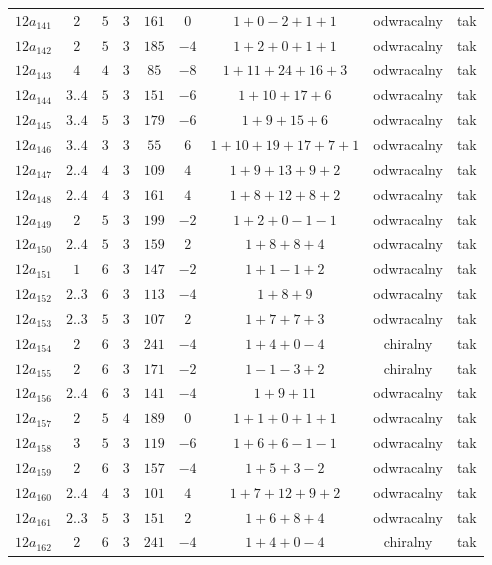 \begin{longtable}{ccccccccc}
$12a_{141}$ & $2$ & $5$ & $3$ & $161$ & $0$ & $1+0-2+1+1$ & odwracalny & tak \\
$12a_{142}$ & $2$ & $5$ & $3$ & $185$ & $-4$ & $1+2+0+1+1$ & odwracalny & tak \\
$12a_{143}$ & $4$ & $4$ & $3$ & $85$ & $-8$ & $1+11+24+16+3$ & odwracalny & tak \\
$12a_{144}$ & $3..4$ & $5$ & $3$ & $151$ & $-6$ & $1+10+17+6$ & odwracalny & tak \\
$12a_{145}$ & $3..4$ & $5$ & $3$ & $179$ & $-6$ & $1+9+15+6$ & odwracalny & tak \\
$12a_{146}$ & $3..4$ & $3$ & $3$ & $55$ & $6$ & $1+10+19+17+7+1$ & odwracalny & tak \\
$12a_{147}$ & $2..4$ & $4$ & $3$ & $109$ & $4$ & $1+9+13+9+2$ & odwracalny & tak \\
$12a_{148}$ & $2..4$ & $4$ & $3$ & $161$ & $4$ & $1+8+12+8+2$ & odwracalny & tak \\
$12a_{149}$ & $2$ & $5$ & $3$ & $199$ & $-2$ & $1+2+0-1-1$ & odwracalny & tak \\
$12a_{150}$ & $2..4$ & $5$ & $3$ & $159$ & $2$ & $1+8+8+4$ & odwracalny & tak \\
$12a_{151}$ & $1$ & $6$ & $3$ & $147$ & $-2$ & $1+1-1+2$ & odwracalny & tak \\
$12a_{152}$ & $2..3$ & $6$ & $3$ & $113$ & $-4$ & $1+8+9$ & odwracalny & tak \\
$12a_{153}$ & $2..3$ & $5$ & $3$ & $107$ & $2$ & $1+7+7+3$ & odwracalny & tak \\
$12a_{154}$ & $2$ & $6$ & $3$ & $241$ & $-4$ & $1+4+0-4$ & chiralny & tak \\
$12a_{155}$ & $2$ & $6$ & $3$ & $171$ & $-2$ & $1-1-3+2$ & chiralny & tak \\
$12a_{156}$ & $2..4$ & $6$ & $3$ & $141$ & $-4$ & $1+9+11$ & odwracalny & tak \\
$12a_{157}$ & $2$ & $5$ & $4$ & $189$ & $0$ & $1+1+0+1+1$ & odwracalny & tak \\
$12a_{158}$ & $3$ & $5$ & $3$ & $119$ & $-6$ & $1+6+6-1-1$ & odwracalny & tak \\
$12a_{159}$ & $2$ & $6$ & $3$ & $157$ & $-4$ & $1+5+3-2$ & odwracalny & tak \\
$12a_{160}$ & $2..4$ & $4$ & $3$ & $101$ & $4$ & $1+7+12+9+2$ & odwracalny & tak \\
$12a_{161}$ & $2..3$ & $5$ & $3$ & $151$ & $2$ & $1+6+8+4$ & odwracalny & tak \\
$12a_{162}$ & $2$ & $6$ & $3$ & $241$ & $-4$ & $1+4+0-4$ & chiralny & tak \\

\end{longtable}
